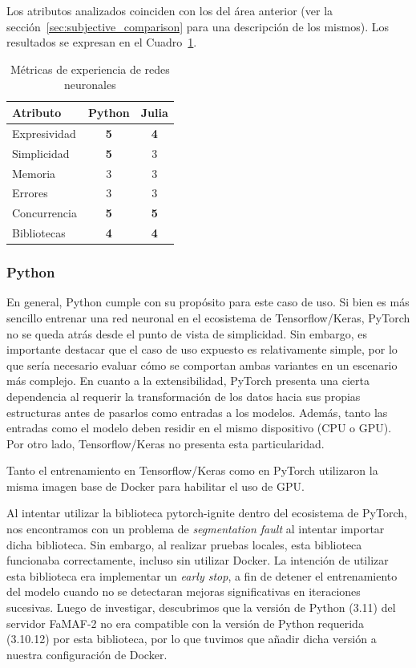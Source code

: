 \documentclass[11pt]{article}
\let\Oldsubsubsection\subsubsection
\renewcommand{\subsubsection}{\FloatBarrier\Oldsubsubsection}
\newcommand{\goodMetric}[1]{{\textbf{#1}}}
\newcommand{\english}[1]{\textit{#1}}
\begin{document}
Los atributos analizados coinciden con los del área anterior (ver la sección~\ref{sec:subjective_comparison} para una descripción de los mismos).
Los resultados se expresan en el Cuadro~\ref{tab:nn:experiences}.

\begin{table}[h]
\centering
\begin{tabular}{|l|cc|}
\hline
Atributo & \multicolumn{1}{c|}{Python} & Julia \\ \hline
Expresividad & \multicolumn{1}{c|}{\goodMetric{5}} & \goodMetric{4} \\ \hline
Simplicidad & \multicolumn{1}{c|}{\goodMetric{5}} & 3 \\ \hline
Memoria & \multicolumn{1}{c|}{3} & 3 \\ \hline
Errores & \multicolumn{1}{c|}{3} & 3 \\ \hline
Concurrencia & \multicolumn{1}{c|}{\goodMetric{5}} & \goodMetric{5} \\ \hline
Bibliotecas & \multicolumn{1}{c|}{\goodMetric{4}} & \goodMetric{4} \\ \hline
\end{tabular}
\caption{Métricas de experiencia de redes neuronales}
\label{tab:nn:experiences}
\end{table}

\subsubsection{Python}

En general, Python cumple con su propósito para este caso de uso. Si bien es más sencillo entrenar una red neuronal en el ecosistema de Tensorflow/Keras, PyTorch no se queda atrás desde el punto de vista de simplicidad. Sin embargo, es importante destacar que el caso de uso expuesto es relativamente simple, por lo que sería necesario evaluar cómo se comportan ambas variantes en un escenario más complejo. En cuanto a la extensibilidad, PyTorch presenta una cierta dependencia al requerir la transformación de los datos hacia sus propias estructuras antes de pasarlos como entradas a los modelos. Además, tanto las entradas como el modelo deben residir en el mismo dispositivo (CPU o GPU). Por otro lado, Tensorflow/Keras no presenta esta particularidad.

Tanto el entrenamiento en Tensorflow/Keras como en PyTorch utilizaron la misma imagen base de Docker para habilitar el uso de GPU. 

Al intentar utilizar la biblioteca pytorch-ignite \cite{python:lib:pytorch-ignite} dentro del ecosistema de PyTorch, nos encontramos con un problema de \english{segmentation fault} al intentar importar dicha biblioteca. Sin embargo, al realizar pruebas locales, esta biblioteca funcionaba correctamente, incluso sin utilizar Docker. La intención de utilizar esta biblioteca era implementar un \english{early stop}, a fin de detener el entrenamiento del modelo cuando no se detectaran mejoras significativas en iteraciones sucesivas. Luego de investigar, descubrimos que la versión de Python (3.11) del servidor FaMAF-2 no era compatible con la versión de Python requerida (3.10.12) por esta biblioteca, por lo que tuvimos que añadir dicha versión a nuestra configuración de Docker.
\end{document}
